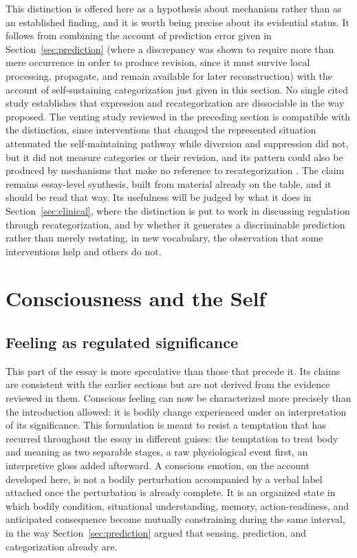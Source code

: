 \documentclass[11pt]{article}
\begin{document}
This distinction is offered here as a hypothesis about mechanism rather than as an established finding, and it is worth being precise about its evidential status. It follows from combining the account of prediction error given in Section~\ref{sec:prediction} (where a discrepancy was shown to require more than mere occurrence in order to produce revision, since it must survive local processing, propagate, and remain available for later reconstruction) with the account of self-sustaining categorization just given in this section. No single cited study establishes that expression and recategorization are dissociable in the way proposed. The venting study reviewed in the preceding section is compatible with the distinction, since interventions that changed the represented situation attenuated the self-maintaining pathway while diversion and suppression did not, but it did not measure categories or their revision, and its pattern could also be produced by mechanisms that make no reference to recategorization \citep{Zhang2026}. The claim remains essay-level synthesis, built from material already on the table, and it should be read that way. Its usefulness will be judged by what it does in Section~\ref{sec:clinical}, where the distinction is put to work in discussing regulation through recategorization, and by whether it generates a discriminable prediction rather than merely restating, in new vocabulary, the observation that some interventions help and others do not.

\section{Consciousness and the Self}\label{sec:consciousness}

\subsection{Feeling as regulated significance}

This part of the essay is more speculative than those that precede it. Its claims are consistent with the earlier sections but are not derived from the evidence reviewed in them. Conscious feeling can now be characterized more precisely than the introduction allowed: it is bodily change experienced under an interpretation of its significance. This formulation is meant to resist a temptation that has recurred throughout the essay in different guises: the temptation to treat body and meaning as two separable stages, a raw physiological event first, an interpretive gloss added afterward. A conscious emotion, on the account developed here, is not a bodily perturbation accompanied by a verbal label attached once the perturbation is already complete. It is an organized state in which bodily condition, situational understanding, memory, action-readiness, and anticipated consequence become mutually constraining during the same interval, in the way Section~\ref{sec:prediction} argued that sensing, prediction, and categorization already are.
\end{document}
